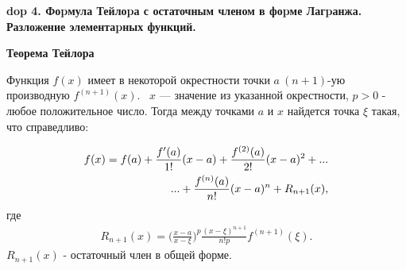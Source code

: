 \setcounter{section}{4}
\setcounter{subsection}{4}
\setcounter{equation}{0}
\textbf{\LARGE dop 4. Фоpмула Тейлоpа с остаточным членом в фоpме Лагpанжа. Разложение элементаpных функций.}

\textbf{Теорема Тейлора}

\mathLet Функция $f(x)$ имеет в некоторой окрестности  точки $a \ (n+1)$-ую производную $f^{(n+1)}(x)$. \mathLet \ $x$ --- значение из указанной окрестности, $p > 0$ - любое положительное число. Тогда между точками $a$ и $x$ найдется точка $\xi$ такая, что справедливо:

\begin{align}\label{Taylor}
    f(x) = f(a) + \frac{f'(a)}{1!}(x-a) + \frac{f^{(2)}(a)}{2!}(x-a)^2 + ... \notag\\
    ... + \frac{f^{(n)}(a)}{n!}(x-a)^n + R_{n+1}(x),
\end{align}
где
\begin{align}\label{R_n+1_condition}
    R_{n+1}(x) = \bigg(\frac{x-a}{x-\xi}\bigg)^p\frac{(x-\xi)^{n+1}}{n!p}f^{(n+1)}(\xi).
\end{align}
$R_{n+1}(x)$ - остаточный член в общей форме.

